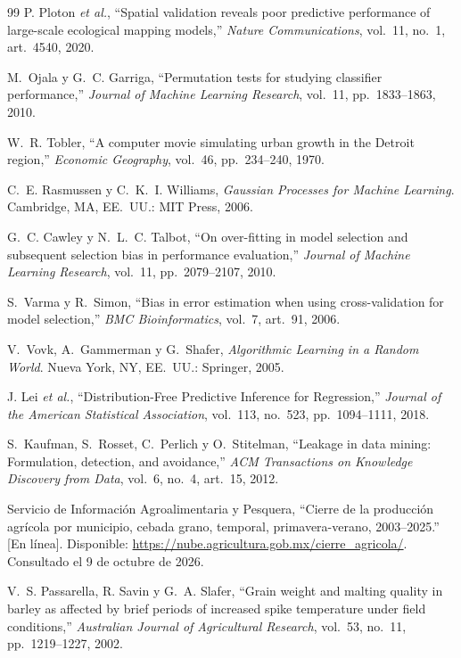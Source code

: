 \begin{thebibliography}{99}
P. Ploton \emph{et al.}, ``Spatial validation reveals poor predictive performance of large-scale ecological mapping models,'' \emph{Nature Communications}, vol.~11, no.~1, art.~4540, 2020.

M.~Ojala y G.~C. Garriga, ``Permutation tests for studying classifier performance,'' \emph{Journal of Machine
Learning Research}, vol.~11, pp.~1833--1863, 2010.

W.~R. Tobler, ``A computer movie simulating urban growth in the Detroit region,'' \emph{Economic Geography},
vol.~46, pp.~234--240, 1970.

C.~E. Rasmussen y C.~K.~I. Williams, \emph{Gaussian Processes for Machine Learning}. Cambridge, MA, EE.~UU.: MIT
Press, 2006.

G.~C. Cawley y N.~L.~C. Talbot, ``On over-fitting in model selection and subsequent selection bias in performance
evaluation,'' \emph{Journal of Machine Learning Research}, vol.~11, pp.~2079--2107, 2010.

S.~Varma y R.~Simon, ``Bias in error estimation when using cross-validation for model selection,'' \emph{BMC
Bioinformatics}, vol.~7, art.~91, 2006.

V.~Vovk, A.~Gammerman y G.~Shafer, \emph{Algorithmic Learning in a Random World}. Nueva York, NY, EE.~UU.:
Springer, 2005.

J. Lei \emph{et al.}, ``Distribution-Free Predictive Inference for Regression,'' \emph{Journal of the American Statistical Association}, vol.~113, no.~523, pp.~1094--1111, 2018.

S.~Kaufman, S.~Rosset, C.~Perlich y O.~Stitelman, ``Leakage in data mining: Formulation, detection, and
avoidance,'' \emph{ACM Transactions on Knowledge Discovery from Data}, vol.~6, no.~4, art.~15, 2012.

Servicio de Información Agroalimentaria y Pesquera, ``Cierre de la producción agrícola por municipio, cebada grano,
temporal, primavera-verano, 2003--2025.'' [En línea]. Disponible: \url{https://nube.agricultura.gob.mx/cierre_agricola/}.
Consultado el 9 de octubre de 2026.

V.~S. Passarella, R. Savin y G.~A. Slafer, ``Grain weight and malting quality in barley as affected by brief periods of increased spike temperature under field conditions,'' \emph{Australian Journal of Agricultural Research}, vol.~53, no.~11, pp.~1219--1227, 2002.


\end{thebibliography}
